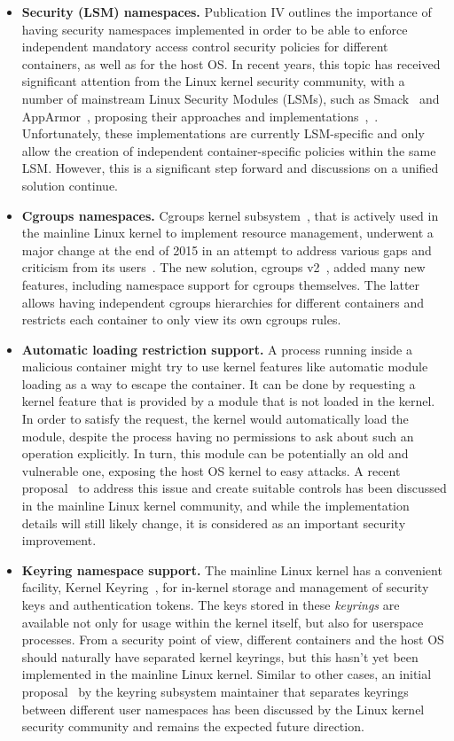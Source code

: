 \begin{itemize}
	\item \textbf{Security (LSM) namespaces.} Publication IV outlines the importance of having security namespaces implemented in order to be able to enforce independent mandatory access control security policies for different containers, as well as for the host OS. In recent years, this topic has received significant attention from the Linux kernel security community, with a number of mainstream Linux Security Modules (LSMs), such as Smack~\cite{smack} and AppArmor~\cite{bauer2006paranoid}, proposing their approaches and implementations~\cite{smackns},~\cite{apparmorns}. Unfortunately, these implementations are currently LSM-specific and only allow the creation of independent container-specific policies within the same LSM. However, this is a significant step forward and discussions on a unified solution continue.
	\item \textbf{Cgroups namespaces.} Cgroups kernel subsystem~\cite{cgroupsv2}, that is actively used in the mainline Linux kernel to implement resource management, underwent a major change at the end of 2015 in an attempt to address various gaps and criticism from its users~\cite{rosen2016}. The new solution, cgroups v2~\cite{cgroupsv2}, added many new features, including namespace support for cgroups themselves. The latter allows having independent cgroups hierarchies for different containers and restricts each container to only view its own cgroups rules. 
	\item \textbf{Automatic loading restriction support.} A process running inside a malicious container might try to use kernel features like automatic module loading as a way to escape the container. It can be done by requesting a kernel feature that is provided by a module that is not loaded in the kernel. In order to satisfy the request, the kernel would automatically load the module, despite the process having no permissions to ask about such an operation explicitly. In turn, this module can be potentially an old and vulnerable one, exposing the host OS kernel to easy attacks. A recent proposal~\cite{harouni2017} to address this issue and create suitable controls has been discussed in the mainline Linux kernel community, and while the implementation details will still likely change, it is considered as an important security improvement. 
  \item \textbf{Keyring namespace support.} The mainline Linux kernel has a convenient facility, Kernel Keyring~\cite{keyrings}, for in-kernel storage and management of security keys and authentication tokens. The keys stored in these \textit{keyrings} are available not only for usage within the kernel itself, but also for userspace processes. From a security point of view, different containers and the host OS should naturally have separated kernel keyrings, but this hasn't yet been implemented in the mainline Linux kernel. Similar to other cases, an initial proposal~\cite{howells2016} by the keyring subsystem maintainer that separates keyrings between different user namespaces has been discussed by the Linux kernel security community and remains the expected future direction. 

\end{itemize}
